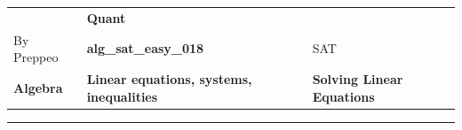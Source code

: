 \documentclass[11pt,paper=a4,answers]{exam}
\begin{document}
\begin{center}
    \centering
    \renewcommand{\arraystretch}{1.5}
    \begin{tabularx}{\textwidth}{YYY}
    & \normalsize\bf{{\Large{{Quant}}}} & \\
    By Preppeo & \normalsize\bf{{alg\_sat\_easy\_018}} & SAT\\
    \normalsize{{\textbf{{Algebra}} }} & \normalsize{{\textbf{{Linear equations, systems, inequalities }} }} & \normalsize{{\textbf{{Solving Linear Equations}} }} \\
    \end{tabularx}
\end{center}
\par\noindent\rule{\textwidth}{1pt}
\end{document}
